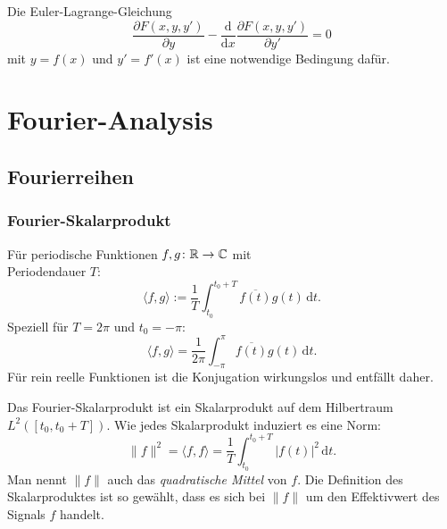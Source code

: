 Die Euler-Lagrange-Gleichung
\begin{equation}
\frac{\partial F(x,y,y')}{\partial y}
-\frac{\mathrm d}{\mathrm dx}\frac{\partial F(x,y,y')}{\partial y'}
=0
\end{equation}
mit $y=f(x)$ und $y'=f'(x)$ ist eine notwendige Bedingung dafür.

\newpage
\section{Fourier-Analysis}
\subsection{Fourierreihen}
\subsubsection{Fourier-Skalarprodukt}%
\begin{definition}
Für periodische Funktionen $f,g\colon\mathbb R\to\mathbb C$ mit\\
Periodendauer $T$:
\begin{equation}\label{eq:Fourier-Skalarprodukt}
\langle f,g\rangle := \frac{1}{T}\int_{t_0}^{t_0+T} \overline{f(t)}g(t)\,\mathrm dt.
\end{equation}
Speziell für $T=2\pi$ und $t_0=-\pi$:
\begin{equation}
\langle f,g\rangle = \frac{1}{2\pi}\int_{-\pi}^{\pi} \overline{f(t)}g(t)\,\mathrm dt.
\end{equation}
Für rein reelle Funktionen ist die Konjugation wirkungslos
und entfällt daher.
\end{definition}
Das Fourier-Skalarprodukt ist ein Skalarprodukt auf dem Hilbertraum
$L^2([t_0,t_0+T])$. Wie jedes Skalarprodukt induziert es eine Norm:%
\begin{equation}\label{eq:Fourier-Norm}
\|f\|^2 = \langle f,f\rangle
= \frac{1}{T}\int_{t_0}^{t_0+T} |f(t)|^2\,\mathrm dt.
\end{equation}
Man nennt $\|f\|$ auch das \emph{quadratische Mittel} von $f$.
Die Definition des Skalarproduktes ist so gewählt, dass es sich
bei $\|f\|$ um den Effektivwert des Signals $f$ handelt.

